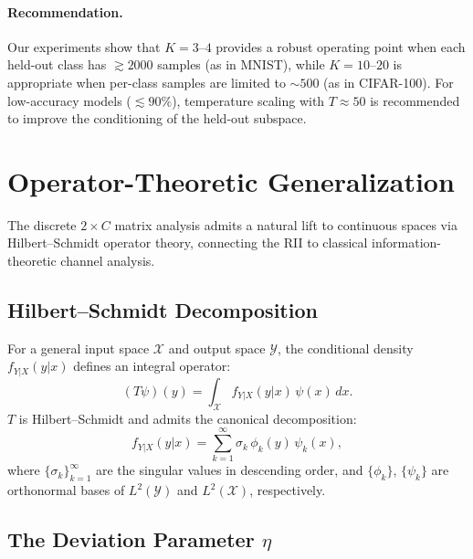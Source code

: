 \documentclass[journal]{IEEEtran}
\theoremstyle{definition}
\begin{document}
\paragraph{Recommendation.}
Our experiments show that $K = 3$--$4$ provides a robust operating point when each held-out class has $\gtrsim 2000$ samples (as in MNIST), while $K = 10$--$20$ is appropriate when per-class samples are limited to $\sim 500$ (as in CIFAR-100). For low-accuracy models ($\lesssim 90\%$), temperature scaling with $T \approx 50$ is recommended to improve the conditioning of the held-out subspace.

\section{Operator-Theoretic Generalization}
\label{sec:operator}

The discrete $2\times C$ matrix analysis admits a natural lift to continuous spaces via Hilbert--Schmidt operator theory, connecting the RII to classical information-theoretic channel analysis.

\subsection{Hilbert--Schmidt Decomposition}

For a general input space $\mathcal{X}$ and output space $\mathcal{Y}$, the conditional density $f_{Y|X}(y|x)$ defines an integral operator:
\begin{equation}
(T\psi)(y) = \int_{\mathcal{X}} f_{Y|X}(y|x)\,\psi(x)\,dx.
\label{eq:operator}
\end{equation}
$T$ is Hilbert--Schmidt and admits the canonical decomposition:
\begin{equation}
f_{Y|X}(y|x) = \sum_{k=1}^{\infty} \sigma_k\,\phi_k(y)\,\psi_k(x),
\label{eq:hs_decomp}
\end{equation}
where $\{\sigma_k\}_{k=1}^\infty$ are the singular values in descending order, and $\{\phi_k\}$, $\{\psi_k\}$ are orthonormal bases of $L^2(\mathcal{Y})$ and $L^2(\mathcal{X})$, respectively.

\subsection{The Deviation Parameter $\eta$}
\end{document}
